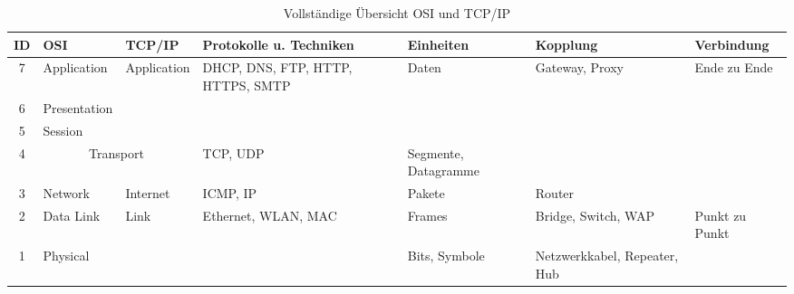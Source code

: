 \begin{table}
    [H]
    \centering
    \begin{tabularx}{\textwidth}{|c|l|l|>{\raggedright\arraybackslash}X|>{\raggedright\arraybackslash}X|>{\raggedright\arraybackslash}X|>{\raggedright\arraybackslash}X|}
        \hline
        \textbf{ID} & \textbf{OSI}                     & \textbf{TCP/IP} & \textbf{Protokolle u. Techniken}  & \textbf{Einheiten} & \textbf{Kopplung}            & \textbf{Verbindung} \\\hline
        7           & Application                      & Application     & DHCP, DNS, FTP, HTTP, HTTPS, SMTP & Daten              & Gateway, Proxy               & Ende zu Ende        \\\cline{1-2}
        6           & Presentation                     &                 &                                   &                    &                              &                     \\\cline{1-2}
        5           & Session                          &                 &                                   &                    &                              &                     \\\cline{1-5}
        4           & \multicolumn{2}{c|}{Transport  } & TCP, UDP        & Segmente, Datagramme              &                    &                                                    \\\cline{1-6}
        3           & Network                          & Internet        & ICMP, IP                          & Pakete             & Router                       &                     \\\cline{1-7}
        2           & Data Link                        & Link            & Ethernet, WLAN, MAC               & Frames             & Bridge, Switch, WAP          & Punkt zu Punkt      \\\cline{1-2}\cline{5-6}
        1           & Physical                         &                 &                                   & Bits, Symbole      & Netzwerkkabel, Repeater, Hub &                     \\\hline
    \end{tabularx}
    \caption{Vollständige Übersicht OSI und TCP/IP}
\end{table}